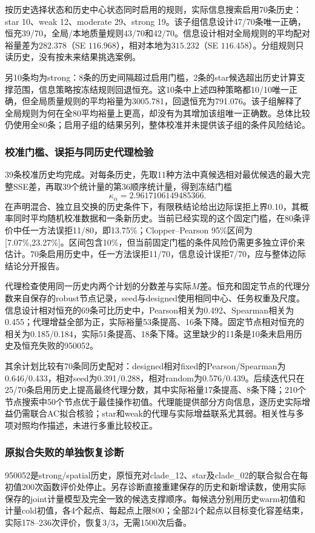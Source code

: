 按历史选择状态和历史中心状态同时启用的规则，实际信息搜索启用70条历史：star 10、weak 12、moderate 29、strong 19。该子组信息设计47/70条唯一正确，恒充39/70，全局/本地质量规则43/70和42/70。信息设计相对全局规则的平均配对裕量差为$282.378$（SE $116.968$），相对本地为$315.232$（SE $116.458$）。分组规则只读历史，没有按未来结果挑选案例。

另10条均为strong：8条的历史间隔超过启用门槛，2条的star候选超出历史计算支撑范围，信息策略按冻结规则回退恒充。这10条中上述四种策略都10/10唯一正确，但全局质量规则的平均裕量为3005.781，回退恒充为791.076。该子组解释了全局规则为何在全80平均裕量上更高，却没有为其增加该组唯一正确数。总体比较仍使用全80条；启用子组的结果另列，整体校准并未提供该子组的条件风险结论。

\subsubsection{校准门槛、误拒与同历史代理检验}
39条校准历史均完成。对每条历史，先取11种方法中真候选相对最优候选的最大完整SSE差，再取39个统计量的第36顺序统计量，得到冻结门槛
\[
 \kappa_\alpha=2.9617106149485366.
\]
在声明混合、独立且交换的历史条件下，有限秩结论给出边际误拒上界0.10，其概率同时平均随机校准数据和一条新历史。当前已经实现的这个固定门槛，在80条评价中任一方法误拒11/80，即13.75\%；Clopper--Pearson 95\%区间为[7.07\%,23.27\%]。区间包含10\%，但当前固定门槛的条件风险仍需更多独立评价来估计。70条启用历史中，任一方法误拒11/70，信息设计误拒7/70，应与整体边际结论分开报告。

代理检查使用同一历史内两个计划的分数差与实际$M$差。恒充和固定节点的代理分数来自保存的robust节点记录，seed与designed使用相同中心、任务权重及尺度。信息设计相对恒充的69条可比历史中，Pearson相关为0.492、Spearman相关为0.455；代理增益全部为正，实际裕量53条提高、16条下降。固定节点相对恒充的相关为0.185/0.184，实际51条提高、18条下降。这里缺少的11条是10条未启用历史及恒充失败的950052。

其余计划比较有70条同历史配对：designed相对fixed的Pearson/Spearman为0.646/0.433，相对seed为0.391/0.288，相对random为0.576/0.439。后续迭代只在25/70条启用历史上提高最终代理分数，其中实际裕量17条提高、8条下降；210个节点搜索中50个节点优于最佳操作初值。代理能提供部分方向信息，逐历史实际增益仍需联合AC拟合核验；star和weak的代理与实际增益联系尤其弱。相关性与多项对照均作描述，未进行多重比较校正。

\subsubsection{原拟合失败的单独恢复诊断}
950052是strong/spatial历史，原恒充对clade\_12、star及clade\_02的联合拟合在每初值200次函数评价处停止。另存诊断直接重建保存的历史和新增读数，使用实际保存的joint计量模型及完全一致的候选支撑顺序。每候选分别用历史warm初值和计量cold初值，各4个起点、每起点上限800；全部24个起点以目标变化容差结束，实际178--236次评价，恢复3/3，无需1500次后备。

